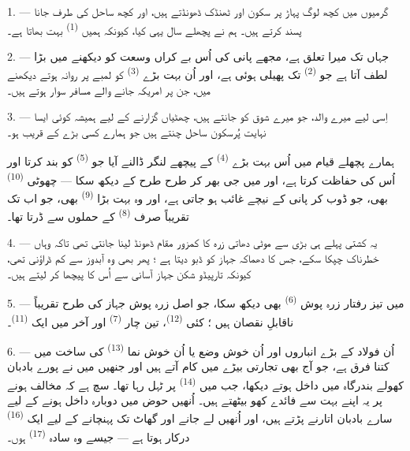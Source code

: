 \VUsaut{4.0mm}
\VUsaut{3.0mm}
\VUsaut{3.0mm}

1. --- گرمیوں میں کچھ لوگ پہاڑ پر سکون اور ٹھنڈک ڈھونڈتے ہیں، اور
کچھ ساحل کی طرف جانا پسند کرتے ہیں۔ ہم نے پچھلے سال یہی کیا، کیونکہ
ہمیں  \textsuperscript{(1)} بہت بھاتا ہے۔

2. --- جہاں تک میرا تعلق ہے، مجھے پانی کی اُس بے کراں وسعت کو دیکھنے
میں بڑا لطف آتا ہے جو  \textsuperscript{(2)} تک پھیلی ہوئی
ہے، اور اُن بہت بڑے  \textsuperscript{(3)} کو
لمبے  پر روانہ ہوتے دیکھنے میں، جن پر امریکہ جانے
والے مسافر سوار ہوتے ہیں۔

3. --- اِسی لیے میرے والد، جو میرے شوق کو جانتے ہیں، چھٹیاں گزارنے
کے لیے ہمیشہ کوئی ایسا نہایت پُرسکون ساحل چنتے ہیں جو ہمارے کسی بڑے
 کے قریب ہو۔

ہمارے پچھلے قیام میں  اُس بہت بڑے 
\textsuperscript{(4)} کے پیچھے لنگر ڈالنے آیا جو  \textsuperscript{(5)} کو بند کرتا اور اُس کی حفاظت کرتا ہے،
اور میں جی بھر کر طرح طرح کے  دیکھ سکا — چھوٹی
 \textsuperscript{(10)} بھی، جو ڈوب کر پانی کے نیچے غائب
ہو جاتی ہے، اور وہ بہت بڑا 
\textsuperscript{(9)} بھی، جو اب تک تقریباً صرف 
\textsuperscript{(8)} کے حملوں سے ڈرتا تھا۔

\VUsaut{3.0mm}
\VUsaut{3.0mm}

4. --- یہ کشتی پہلے ہی بڑی  سے موٹی دھاتی زرہ کا کمزور
مقام ڈھونڈ لینا جانتی تھی تاکہ وہاں خطرناک  چپکا
سکے، جس کا دھماکہ جہاز کو ڈبو دیتا ہے ؛ پھر بھی وہ آبدوز سے کم ڈراؤنی
تھی، کیونکہ تارپیڈو شکن جہاز آسانی سے اُس کا پیچھا کر لیتے ہیں۔

5. --- میں تیز رفتار زرہ پوش  \textsuperscript{(6)} بھی
دیکھ سکا، جو اصل زرہ پوش جہاز کی طرح تقریباً ناقابلِ نقصان ہیں ؛ کئی
 \textsuperscript{(12)}، تین چار
 \textsuperscript{(7)} اور آخر میں ایک
 \textsuperscript{(11)}۔ 

6. --- اُن فولاد کے بڑے انباروں اور اُن خوش وضع  یا اُن خوش نما  \textsuperscript{(13)}
کی ساخت میں کتنا فرق ہے، جو آج بھی تجارتی بیڑے میں کام آتے ہیں اور
جنھیں میں نے پورے بادبان کھولے بندرگاہ میں داخل ہوتے دیکھا، جب میں
 \textsuperscript{(14)} پر ٹہل رہا تھا۔ سچ ہے کہ
 مخالف ہونے پر یہ اپنے بہت سے فائدے کھو بیٹھتے ہیں۔
اُنھیں حوض میں دوبارہ داخل ہونے کے لیے سارے بادبان اتارنے پڑتے ہیں،
اور اُنھیں لے جانے اور گھاٹ تک پہنچانے کے لیے ایک 
\textsuperscript{(16)} درکار ہوتا ہے — جیسے وہ سادہ  \textsuperscript{(17)} ہوں۔


